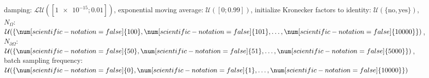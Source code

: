damping: $\mathcal{LU}([\num[scientific-notation=true]{1e-15}; \num[scientific-notation=true]{0.01}])$, exponential moving average: $\mathcal{U}([\num[scientific-notation=false]{0}; \num[scientific-notation=true]{0.99}])$, initialize Kronecker factors to identity: $\mathcal{U}(\{\text{no},\text{yes}\})$, $N_{\Omega}$: $\mathcal{U}(\{\num[scientific-notation=false]{100},\num[scientific-notation=false]{101},\text{\dots},\num[scientific-notation=false]{10000}\})$, $N_{\partial\Omega}$: $\mathcal{U}(\{\num[scientific-notation=false]{50},\num[scientific-notation=false]{51},\text{\dots},\num[scientific-notation=false]{5000}\})$, batch sampling frequency: $\mathcal{U}(\{\num[scientific-notation=false]{0},\num[scientific-notation=false]{1},\text{\dots},\num[scientific-notation=false]{10000}\})$